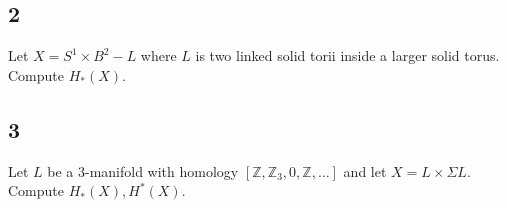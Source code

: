 \hypertarget{section-1}{%
\subsection{2}\label{section-1}}

Let \(X = S^1 \times B^2 - L\) where \(L\) is two linked solid torii
inside a larger solid torus. Compute \(H_*(X)\). 

\hypertarget{section-2}{%
\subsection{3}\label{section-2}}

Let \(L\) be a 3-manifold with homology
\([{\mathbb{Z}}, {\mathbb{Z}}_3, 0, {\mathbb{Z}}, \ldots]\) and let
\(X = L \times\Sigma L\). Compute \(H_*(X), H^*(X)\).

